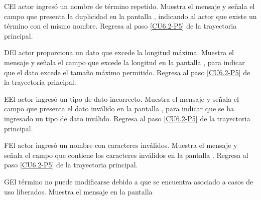 	\begin{UCtrayectoriaA}{C}{El actor ingresó un nombre de término repetido.}
		\UCpaso[\UCsist] Muestra el mensaje  y señala el campo que presenta la duplicidad en la pantalla , indicando al actor que existe un término con el mismo nombre.
		\UCpaso Regresa al paso \ref{CU6.2-P5} de la trayectoria principal.
	\end{UCtrayectoriaA}

	\begin{UCtrayectoriaA}{D}{El actor proporciona un dato que excede la longitud máxima.}
		\UCpaso[\UCsist] Muestra el mensaje  y señala el campo que excede la longitud en la pantalla , para indicar que el dato excede el tamaño máximo permitido.
		\UCpaso Regresa al paso \ref{CU6.2-P5} de la trayectoria principal.
	\end{UCtrayectoriaA}

	\begin{UCtrayectoriaA}{E}{El actor ingresó un tipo de dato incorrecto.}
		\UCpaso[\UCsist] Muestra el mensaje  y señala el campo que presenta el dato inválido en la pantalla , para indicar que se ha ingresado un tipo de dato inválido.
		\UCpaso Regresa al paso \ref{CU6.2-P5} de la trayectoria principal.
	\end{UCtrayectoriaA}

	\begin{UCtrayectoriaA}{F}{El actor ingresó un nombre con caracteres inválidos.}
	\UCpaso[\UCsist] Muestra el mensaje  y señala el campo que contiene los caracteres inválidos en la pantalla .
	\UCpaso Regresa al paso \ref{CU6.2-P5} de la trayectoria principal.
	\end{UCtrayectoriaA}


	\begin{UCtrayectoriaA}{G}{El término no puede modificarse debido a que se encuentra asociado a casos de uso liberados.}
		\UCpaso[\UCsist] Muestra el mensaje  en la pantalla 
	\end{UCtrayectoriaA}
